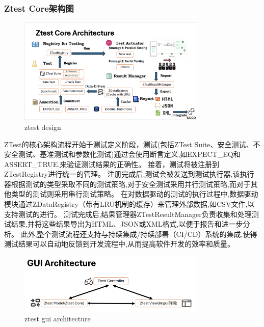 \documentclass{article}
\begin{document}
\subsubsection{Ztest Core架构图}
\begin{figure}[H]
    \centering
    \includegraphics[width=0.8\textwidth]{img/corearch.png} %
    \caption{ ztest design}
    \label{fig:ztest design }
\end{figure}
ZTest的核心架构流程开始于测试定义阶段，测试(包括ZTest Suite、安全测试、不安全测试、基准测试和参数化测试)通过会使用断言定义,如EXPECT\_EQ和ASSERT\_TRUE,来验证测试结果的正确性。
接着，测试将被注册到ZTestRegistry进行统一的管理。
注册完成后,测试会被发送到测试执行器,该执行器根据测试的类型采取不同的测试策略,对于安全测试采用并行测试策略,而对于其他类型的测试则采用串行测试策略。
在对数据驱动的测试的执行过程中,数据驱动模块通过ZDataRegistry（带有LRU机制的缓存）来管理外部数据,如CSV文件,以支持测试的进行。
测试完成后,结果管理器ZTestResultManager负责收集和处理测试结果,并将这些结果导出为HTML、JSON或XML格式,以便于报告和进一步分析。
此外,整个测试流程还支持与持续集成/持续部署（CI/CD）系统的集成,使得测试结果可以自动地反馈到开发流程中,从而提高软件开发的效率和质量。
\begin{figure}[H]
    \centering
    \includegraphics[width=0.8\textwidth]{img/guiarch.png} %
    \caption{ ztest gui architecture}
    \label{fig:ztest gui architecture }
\end{figure}
\end{document}
